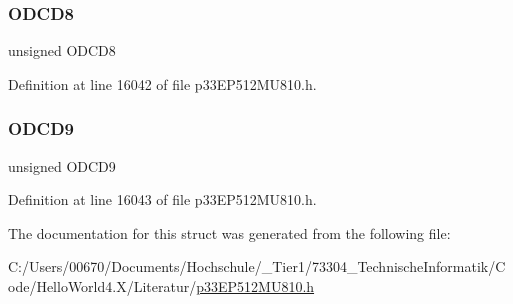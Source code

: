 \subsubsection{\texorpdfstring{O\+D\+C\+D8}{ODCD8}}
{\footnotesize\ttfamily unsigned O\+D\+C\+D8}



Definition at line 16042 of file p33\+E\+P512\+M\+U810.\+h.

\mbox{\label{structtag_o_d_c_d_b_i_t_s_ada6820368670c9c3cd2dbaa8ab262c47}} 
\subsubsection{\texorpdfstring{O\+D\+C\+D9}{ODCD9}}
{\footnotesize\ttfamily unsigned O\+D\+C\+D9}



Definition at line 16043 of file p33\+E\+P512\+M\+U810.\+h.



The documentation for this struct was generated from the following file\+:\begin{DoxyCompactItemize}
\item 
C\+:/\+Users/00670/\+Documents/\+Hochschule/\+\_\+\+Tier1/73304\+\_\+\+Technische\+Informatik/\+Code/\+Hello\+World4.\+X/\+Literatur/\hyperlink{p33_e_p512_m_u810_8h}{p33\+E\+P512\+M\+U810.\+h}\end{DoxyCompactItemize}

